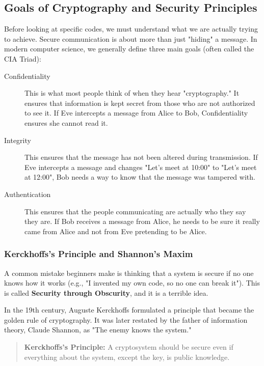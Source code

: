 \documentclass[11pt,a4paper]{report}
\begin{document}
\subsection{Goals of Cryptography and Security Principles}

Before looking at specific codes, we must understand what we are actually trying to achieve. Secure communication is about more than just "hiding" a message. In modern computer science, we generally define three main goals (often called the CIA Triad):

\begin{description}
    \item[Confidentiality] This is what most people think of when they hear "cryptography." It ensures that information is kept secret from those who are not authorized to see it. If Eve intercepts a message from Alice to Bob, Confidentiality ensures she cannot read it.
    \item[Integrity] This ensures that the message has not been altered during transmission. If Eve intercepts a message and changes "Let's meet at 10:00" to "Let's meet at 12:00", Bob needs a way to know that the message was tampered with.
    \item[Authentication] This ensures that the people communicating are actually who they say they are. If Bob receives a message from Alice, he needs to be sure it really came from Alice and not from Eve pretending to be Alice.
\end{description}

\subsubsection{Kerckhoffs's Principle and Shannon's Maxim}

A common mistake beginners make is thinking that a system is secure if no one knows how it works (e.g., "I invented my own code, so no one can break it"). This is called \textbf{Security through Obscurity}, and it is a terrible idea.

In the 19th century, Auguste Kerckhoffs formulated a principle that became the golden rule of cryptography. It was later restated by the father of information theory, Claude Shannon, as "The enemy knows the system."

\begin{quote}
    \textbf{Kerckhoffs's Principle:} A cryptosystem should be secure even if everything about the system, except the key, is public knowledge.
\end{quote}
\end{document}
